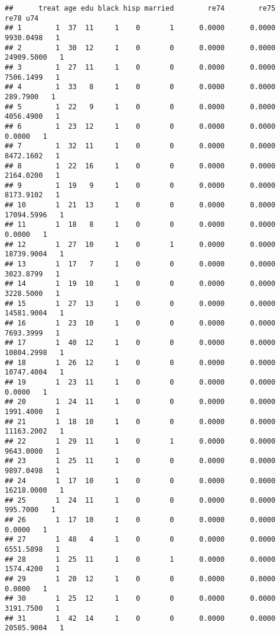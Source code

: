 \documentclass[
]{article}
\begin{document}
\begin{enumerate}
\begin{verbatim}
##      treat age edu black hisp married        re74        re75        re78 u74
## 1        1  37  11     1    0       1      0.0000      0.0000   9930.0498   1
## 2        1  30  12     1    0       0      0.0000      0.0000  24909.5000   1
## 3        1  27  11     1    0       0      0.0000      0.0000   7506.1499   1
## 4        1  33   8     1    0       0      0.0000      0.0000    289.7900   1
## 5        1  22   9     1    0       0      0.0000      0.0000   4056.4900   1
## 6        1  23  12     1    0       0      0.0000      0.0000      0.0000   1
## 7        1  32  11     1    0       0      0.0000      0.0000   8472.1602   1
## 8        1  22  16     1    0       0      0.0000      0.0000   2164.0200   1
## 9        1  19   9     1    0       0      0.0000      0.0000   8173.9102   1
## 10       1  21  13     1    0       0      0.0000      0.0000  17094.5996   1
## 11       1  18   8     1    0       0      0.0000      0.0000      0.0000   1
## 12       1  27  10     1    0       1      0.0000      0.0000  18739.9004   1
## 13       1  17   7     1    0       0      0.0000      0.0000   3023.8799   1
## 14       1  19  10     1    0       0      0.0000      0.0000   3228.5000   1
## 15       1  27  13     1    0       0      0.0000      0.0000  14581.9004   1
## 16       1  23  10     1    0       0      0.0000      0.0000   7693.3999   1
## 17       1  40  12     1    0       0      0.0000      0.0000  10804.2998   1
## 18       1  26  12     1    0       0      0.0000      0.0000  10747.4004   1
## 19       1  23  11     1    0       0      0.0000      0.0000      0.0000   1
## 20       1  24  11     1    0       0      0.0000      0.0000   1991.4000   1
## 21       1  18  10     1    0       0      0.0000      0.0000  11163.2002   1
## 22       1  29  11     1    0       1      0.0000      0.0000   9643.0000   1
## 23       1  25  11     1    0       0      0.0000      0.0000   9897.0498   1
## 24       1  17  10     1    0       0      0.0000      0.0000  16218.0000   1
## 25       1  24  11     1    0       0      0.0000      0.0000    995.7000   1
## 26       1  17  10     1    0       0      0.0000      0.0000      0.0000   1
## 27       1  48   4     1    0       0      0.0000      0.0000   6551.5898   1
## 28       1  25  11     1    0       1      0.0000      0.0000   1574.4200   1
## 29       1  20  12     1    0       0      0.0000      0.0000      0.0000   1
## 30       1  25  12     1    0       0      0.0000      0.0000   3191.7500   1
## 31       1  42  14     1    0       0      0.0000      0.0000  20505.9004   1

\end{verbatim}
\end{enumerate}
\end{document}
